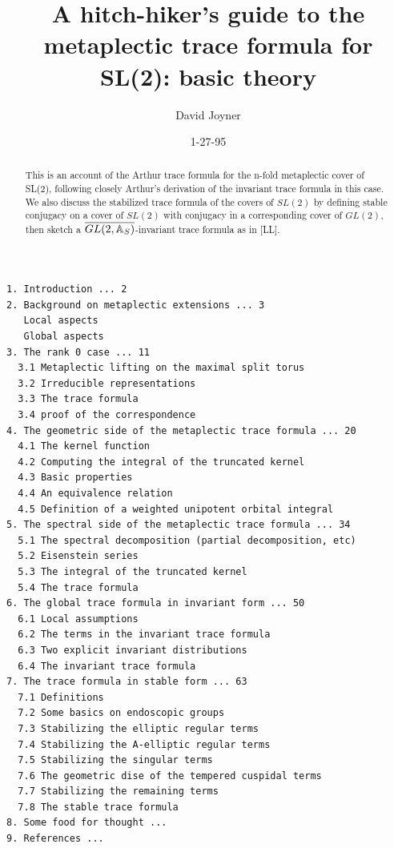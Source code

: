 





\author{David Joyner}
\title{A hitch-hiker's guide to the
metaplectic trace formula for SL(2): basic theory}
\date{1-27-95}
\maketitle

\begin{abstract}
This is an account of the Arthur trace formula for the
n-fold metaplectic cover of SL(2), following closely
Arthur's derivation of the invariant trace formula in this case.
We also discuss the stabilized trace formula of
the covers of $SL(2)$ by defining
stable conjugacy on a cover of $SL(2)$ with conjugacy
in a corresponding cover of $GL(2)$,
then sketch a $\overline{GL(2,{\Bbb{A}}_S)}$-invariant
trace formula as in [LL].
\end{abstract}

\begin{verbatim}
1. Introduction ... 2
2. Background on metaplectic extensions ... 3
   Local aspects
   Global aspects
3. The rank 0 case ... 11
  3.1 Metaplectic lifting on the maximal split torus
  3.2 Irreducible representations
  3.3 The trace formula
  3.4 proof of the correspondence
4. The geometric side of the metaplectic trace formula ... 20
  4.1 The kernel function
  4.2 Computing the integral of the truncated kernel
  4.3 Basic properties
  4.4 An equivalence relation
  4.5 Definition of a weighted unipotent orbital integral
5. The spectral side of the metaplectic trace formula ... 34 
  5.1 The spectral decomposition (partial decomposition, etc)
  5.2 Eisenstein series
  5.3 The integral of the truncated kernel
  5.4 The trace formula
6. The global trace formula in invariant form ... 50
  6.1 Local assumptions
  6.2 The terms in the invariant trace formula
  6.3 Two explicit invariant distributions
  6.4 The invariant trace formula
7. The trace formula in stable form ... 63
  7.1 Definitions
  7.2 Some basics on endoscopic groups
  7.3 Stabilizing the elliptic regular terms
  7.4 Stabilizing the A-elliptic regular terms
  7.5 Stabilizing the singular terms
  7.6 The geometric dise of the tempered cuspidal terms
  7.7 Stabilizing the remaining terms
  7.8 The stable trace formula
8. Some food for thought ... 
9. References ... 
\end{verbatim}

